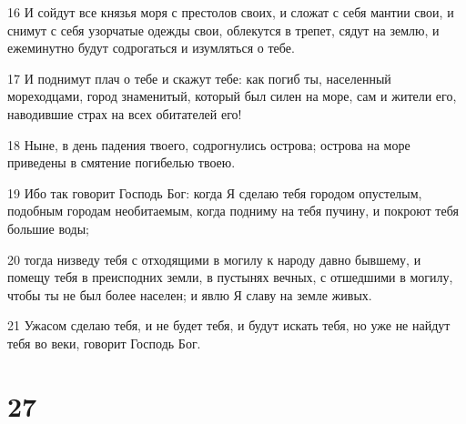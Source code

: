 \par 16 И сойдут все князья моря с престолов своих, и сложат с себя мантии свои, и снимут с себя узорчатые одежды свои, облекутся в трепет, сядут на землю, и ежеминутно будут содрогаться и изумляться о тебе.
\par 17 И поднимут плач о тебе и скажут тебе: как погиб ты, населенный мореходцами, город знаменитый, который был силен на море, сам и жители его, наводившие страх на всех обитателей его!
\par 18 Ныне, в день падения твоего, содрогнулись острова; острова на море приведены в смятение погибелью твоею.
\par 19 Ибо так говорит Господь Бог: когда Я сделаю тебя городом опустелым, подобным городам необитаемым, когда подниму на тебя пучину, и покроют тебя большие воды;
\par 20 тогда низведу тебя с отходящими в могилу к народу давно бывшему, и помещу тебя в преисподних земли, в пустынях вечных, с отшедшими в могилу, чтобы ты не был более населен; и явлю Я славу на земле живых.
\par 21 Ужасом сделаю тебя, и не будет тебя, и будут искать тебя, но уже не найдут тебя во веки, говорит Господь Бог.

\chapter{27}

